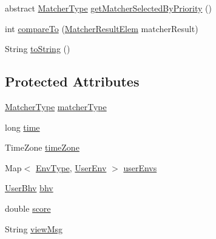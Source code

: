 \begin{DoxyCompactItemize}
\item 
abstract \hyperlink{enumlab_1_1davidahn_1_1appshuttle_1_1predict_1_1matcher_1_1_matcher_type}{\-Matcher\-Type} \hyperlink{classlab_1_1davidahn_1_1appshuttle_1_1predict_1_1matcher_1_1_matcher_result_elem_ad97194660e8eff5d4a12cd8a58cba6e6}{get\-Matcher\-Selected\-By\-Priority} ()
\item 
int \hyperlink{classlab_1_1davidahn_1_1appshuttle_1_1predict_1_1matcher_1_1_matcher_result_elem_a399ff739f9647919c8faa108bf0db09b}{compare\-To} (\hyperlink{classlab_1_1davidahn_1_1appshuttle_1_1predict_1_1matcher_1_1_matcher_result_elem}{\-Matcher\-Result\-Elem} matcher\-Result)
\item 
\-String \hyperlink{classlab_1_1davidahn_1_1appshuttle_1_1predict_1_1matcher_1_1_matcher_result_elem_a2a0f0e69f726c1d5d64bbb11db347006}{to\-String} ()
\end{DoxyCompactItemize}
\subsection*{\-Protected \-Attributes}
\begin{DoxyCompactItemize}
\item 
\hyperlink{enumlab_1_1davidahn_1_1appshuttle_1_1predict_1_1matcher_1_1_matcher_type}{\-Matcher\-Type} \hyperlink{classlab_1_1davidahn_1_1appshuttle_1_1predict_1_1matcher_1_1_matcher_result_elem_ab8de30689d9795776eb324ea0c95ebc6}{matcher\-Type}
\item 
long \hyperlink{classlab_1_1davidahn_1_1appshuttle_1_1predict_1_1matcher_1_1_matcher_result_elem_aea5d6f469e8d97abe0289ce27dfded99}{time}
\item 
\-Time\-Zone \hyperlink{classlab_1_1davidahn_1_1appshuttle_1_1predict_1_1matcher_1_1_matcher_result_elem_a5b0335b322afa5d6b6cb1281252a6665}{time\-Zone}
\item 
\-Map$<$ \hyperlink{enumlab_1_1davidahn_1_1appshuttle_1_1collect_1_1env_1_1_env_type}{\-Env\-Type}, \hyperlink{classlab_1_1davidahn_1_1appshuttle_1_1collect_1_1env_1_1_user_env}{\-User\-Env} $>$ \hyperlink{classlab_1_1davidahn_1_1appshuttle_1_1predict_1_1matcher_1_1_matcher_result_elem_a6bb7143f44692257e316936be62264ae}{user\-Envs}
\item 
\hyperlink{interfacelab_1_1davidahn_1_1appshuttle_1_1collect_1_1bhv_1_1_user_bhv}{\-User\-Bhv} \hyperlink{classlab_1_1davidahn_1_1appshuttle_1_1predict_1_1matcher_1_1_matcher_result_elem_a14e8d4e10828a65a8a988e233ab7510b}{bhv}
\item 
double \hyperlink{classlab_1_1davidahn_1_1appshuttle_1_1predict_1_1matcher_1_1_matcher_result_elem_ab293b2be5e62ac6bb05eccfadd6bdcee}{score}
\item 
\-String \hyperlink{classlab_1_1davidahn_1_1appshuttle_1_1predict_1_1matcher_1_1_matcher_result_elem_a2816b3b8c2973cef2f5def0255caed0f}{view\-Msg}
\end{DoxyCompactItemize}


